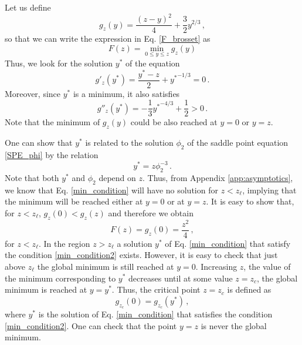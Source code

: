 \documentclass[aps,pre,twocolumn,superscriptaddress,showpacs]{revtex4-1}
\begin{document}
Let us define
\begin{equation}
g_z(y)=\frac{(z-y)^2}{4}+\frac{3}{2}y^{2/3}\,,
\label{gz_def}
\end{equation}
so that we can write the expression in Eq. \eqref{F_brosset} as
\begin{equation}
F(z)=\min_{0\leq y\leq z}g_z(y)
\end{equation}
Thus, we look for the solution $y^*$ of the equation
\begin{equation}
g'_z(y^*)=\frac{y^*-z}{2}+ {y^*}^{-1/3}=0\,.
\label{min_condition}
\end{equation}
Moreover, since $y^*$ is a minimum, it also satisfies
\begin{equation}
g''_z(y^*)=-\frac13 {y^*}^{-4/3}+\frac12>0\,.
\label{min_condition2}
\end{equation}
Note that the minimum of $g_z(y)$ could be also reached at $y=0$ or $y=z$. 

One can show that $y^*$ is related to the solution $\phi_2$ of the saddle point equation \eqref{SPE_phi} by the relation
\begin{equation}
y^*=z\phi_2^{-3}\,.
\label{yphi2}
\end{equation}
Note that both $y^*$ and $\phi_2$ depend on $z$. Thus, from Appendix \ref{app:asymptotics}, we know that Eq. \eqref{min_condition} will have no solution for $z<z_{\ell}$, implying that the minimum will be reached either at $y=0$ or at $y=z$. It is easy to show that, for $z<z_{\ell}$, $g_z(0)<g_z(z)$ and therefore we obtain 
\begin{equation}
F(z)=g_z(0)=\frac{z^2}{4}\,,
\end{equation}
for $z<z_{\ell}$. In the region $z>z_{\ell}$ a solution $y^*$ of Eq. \eqref{min_condition} that satisfy the condition \eqref{min_condition2} exists. However, it is easy to check that just above $z_{\ell}$ the global minimum is still reached at $y=0$. Increasing $z$, the value of the minimum corresponding to $y^*$ decreases until at some value $z=z_c$, the global minimum is reached at $y=y^*$. Thus, the critical point $z=z_c$ is defined as
\begin{equation}
g_{z_c}(0)=g_{z_c}(y^*)\,,
\label{cond_zc}
\end{equation}
where $y^*$ is the solution of Eq. \eqref{min_condition} that satisfies the condition \eqref{min_condition2}. One can check that the point $y=z$ is never the global minimum.
\end{document}
